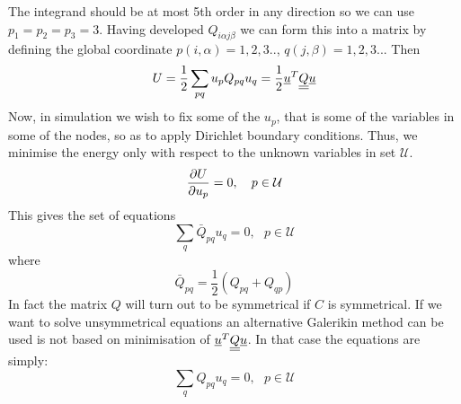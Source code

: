 \documentclass[a4paper]{article}
\begin{document}
The integrand should be at most 5th order in any direction so we can
use $p_1=p_2=p_3=3$. Having developed $Q_{i\alpha j\beta}$ we can form
this into a matrix by defining the global coordinate
$p(i,\alpha)=1,2,3..$, $q(j,\beta)=1,2,3..$. Then
\begin{equation}
  U=\frac12 \sum_{pq} u_p Q_{pq} u_q=\frac12 {\underline{u}}^T \underline{\underline{Q}} {\underline{u}}
\end{equation}
Now, in simulation we wish to fix some of the $u_p$, that is some of
the variables in some of the nodes, so as to apply Dirichlet boundary
conditions. Thus, we minimise the energy only with respect to the
unknown variables in set $\mathcal{U}$.
\begin{equation}
  \frac{\partial U}{\partial u_p}=0,~~~p\in \mathcal U
\end{equation}
This gives the set of equations
\begin{equation}
  \sum_q \bar Q_{pq} u_q=0,~~~p \in\mathcal U
\end{equation}
where
\begin{equation}
  \bar Q_{pq}=\frac12(Q_{pq}+Q_{qp})
\end{equation}
In fact the matrix $Q$ will turn out to be symmetrical if $C$ is
symmetrical. If we want to solve unsymmetrical equations an
alternative Galerikin method can be used is not based on minimisation
of ${\underline{u}}^T\underline{\underline{Q}}{\underline{u}}$. In that case the equations are simply:
\begin{equation}
  \sum_q Q_{pq} u_q=0,~~~p \in\mathcal U
\end{equation}
\end{document}

